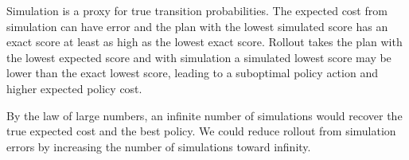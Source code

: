\documentclass[11pt]{exam}
\begin{document}
\begin{questions}
\begin{parts}
\begin{subparts}
            Simulation is a proxy for true transition probabilities. The expected cost from simulation can have error and the plan with the lowest simulated score has an exact score at least as high as the lowest exact score.
            Rollout takes the plan with the lowest expected score and with simulation a simulated lowest score may be lower than the exact lowest score, leading to a suboptimal policy action and higher expected policy cost. 
            
            By the law of large numbers, an infinite number of simulations would recover the true expected cost and the best policy. We could reduce rollout from simulation errors by increasing the number of simulations toward infinity. 
        \end{subparts}
    \end{parts}

\end{questions}
\end{document}
